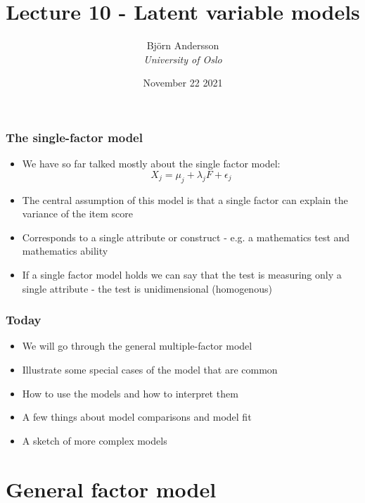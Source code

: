 \documentclass[compress]{beamer}
\title{Lecture 10 - Latent variable models}
\author[]{Bj\"{o}rn Andersson \\\vspace{6pt} {\em{University of Oslo}} }
\date{November 22 2021}
\begin{document}
\begin{frame}[fragile]
\titlepage
\end{frame}

\begin{frame}[fragile]
\frametitle{The single-factor model}
\begin{itemize}
\item We have so far talked mostly about the single factor model:
\[
X_j = \mu_j + \lambda_jF + \epsilon_j
\]
\item The central assumption of this model is that a single factor can explain the variance of the item score
\item Corresponds to a single attribute or construct - e.g. a mathematics test and mathematics ability
\item If a single factor model holds we can say that the test is measuring only a single attribute - the test is unidimensional (homogenous)
\end{itemize}
\end{frame}

\begin{frame}[fragile]
\frametitle{Today}
\begin{itemize}
\item We will go through the general multiple-factor model
\item Illustrate some special cases of the model that are common
\item How to use the models and how to interpret them
\item A few things about model comparisons and model fit
\item A sketch of more complex models
\end{itemize}
\end{frame}

\section*{General factor model}
\end{document}
